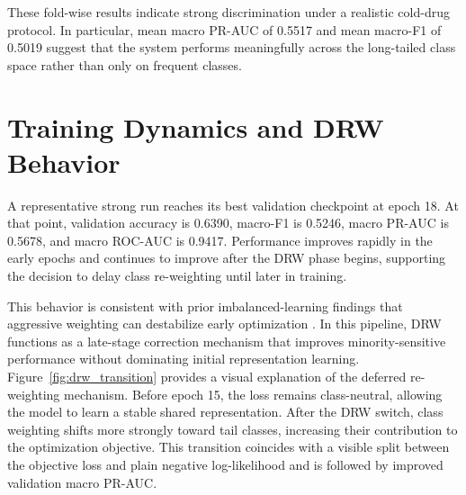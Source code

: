 \documentclass[12pt,a4paper]{report}
\begin{document}
\begin{table}[H]
\centering
\caption{Fold-wise test performance of the strongest cold-drug baseline on reported folds \(f1\)--\(f4\). Fold \(f0\) is excluded because it served as the development fold during hyperparameter screening.}
\label{tab:fold_results}
\end{table}

These fold-wise results indicate strong discrimination under a realistic cold-drug protocol. In particular, mean macro PR-AUC of 0.5517 and mean macro-F1 of 0.5019 suggest that the system performs meaningfully across the long-tailed class space rather than only on frequent classes.

\section{Training Dynamics and DRW Behavior}
A representative strong run reaches its best validation checkpoint at epoch 18. At that point, validation accuracy is 0.6390, macro-F1 is 0.5246, macro PR-AUC is 0.5678, and macro ROC-AUC is 0.9417. Performance improves rapidly in the early epochs and continues to improve after the DRW phase begins, supporting the decision to delay class re-weighting until later in training.

This behavior is consistent with prior imbalanced-learning findings that aggressive weighting can destabilize early optimization \cite{cao2019ldam}. In this pipeline, DRW functions as a late-stage correction mechanism that improves minority-sensitive performance without dominating initial representation learning. Figure~\ref{fig:drw_transition} provides a visual explanation of the deferred re-weighting mechanism. Before epoch 15, the loss remains class-neutral, allowing the model to learn a stable shared representation. After the DRW switch, class weighting shifts more strongly toward tail classes, increasing their contribution to the optimization objective. This transition coincides with a visible split between the objective loss and plain negative log-likelihood and is followed by improved validation macro PR-AUC.
\end{document}
